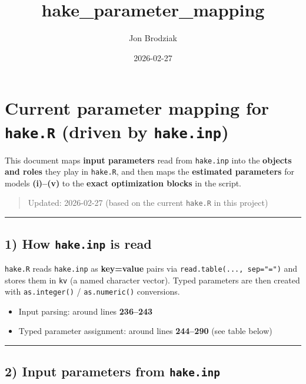 \documentclass[
]{article}
\title{hake\_parameter\_mapping}
\author{Jon Brodziak}
\date{2026-02-27}
\providecommand{\tightlist}{%
  \setlength{\itemsep}{0pt}\setlength{\parskip}{0pt}}
\begin{document}
\maketitle

\section{\texorpdfstring{Current parameter mapping for \texttt{hake.R}
(driven by
\texttt{hake.inp})}{Current parameter mapping for hake.R (driven by hake.inp)}}\label{current-parameter-mapping-for-hake.r-driven-by-hake.inp}

This document maps \textbf{input parameters} read from \texttt{hake.inp}
into the \textbf{objects and roles} they play in \texttt{hake.R}, and
then maps the \textbf{estimated parameters} for models \textbf{(i)--(v)}
to the \textbf{exact optimization blocks} in the script.

\begin{quote}
Updated: 2026-02-27 (based on the current \texttt{hake.R} in this
project)
\end{quote}

\begin{center}\rule{0.5\linewidth}{0.5pt}\end{center}

\subsection{\texorpdfstring{1) How \texttt{hake.inp} is
read}{1) How hake.inp is read}}\label{how-hake.inp-is-read}

\texttt{hake.R} reads \texttt{hake.inp} as \textbf{key=value} pairs via
\texttt{read.table(...,\ sep="=")} and stores them in \texttt{kv} (a
named character vector). Typed parameters are then created with
\texttt{as.integer()} / \texttt{as.numeric()} conversions.

\begin{itemize}
\tightlist
\item
  Input parsing: around lines \textbf{236--243}
\item
  Typed parameter assignment: around lines \textbf{244--290} (see table
  below)
\end{itemize}

\begin{center}\rule{0.5\linewidth}{0.5pt}\end{center}

\subsection{\texorpdfstring{2) Input parameters from
\texttt{hake.inp}}{2) Input parameters from hake.inp}}\label{input-parameters-from-hake.inp}
\end{document}
